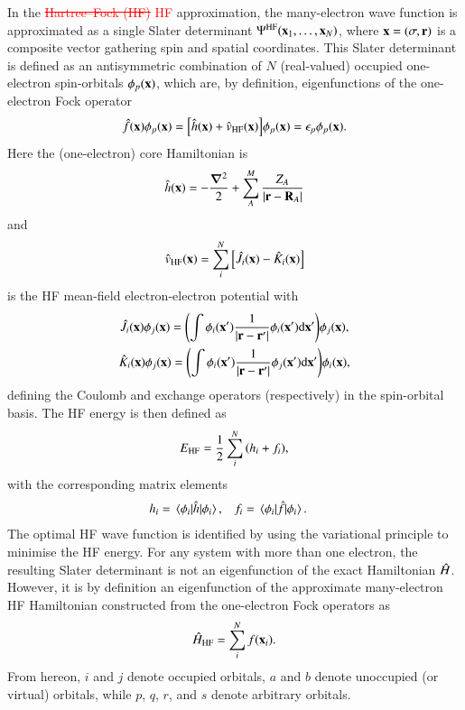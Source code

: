 \documentclass[aps,prb,reprint,noshowkeys,superscriptaddress]{revtex4-1}
\newcommand{\titou}[1]{\textcolor{red}{#1}}
\newcommand{\trash}[1]{\textcolor{red}{\sout{#1}}}
\newcommand{\Ne}{N} %
\newcommand{\Nn}{M} %
\newcommand{\hH}{\Hat{H}}
\begin{document}
In the \trash{Hartree--Fock (HF)} \titou{HF} approximation, the many-electron wave function is approximated as a single Slater determinant $\Psi^{\text{HF}}(\vb{x}_1,\ldots,\vb{x}_\Ne)$, where $\vb{x} = (\sigma,\vb{r})$ is a composite vector gathering spin and spatial coordinates.
This Slater determinant is defined as an antisymmetric combination of $\Ne$ (real-valued) occupied one-electron spin-orbitals $\phi_p(\vb{x})$, which are, by definition, eigenfunctions of the one-electron Fock operator 
\begin{equation}\label{eq:FockOp}
    \Hat{f}(\vb{x}) \phi_p(\vb{x}) = \qty[ \Hat{h}(\vb{x}) + \Hat{v}_\text{HF}(\vb{x}) ] \phi_p(\vb{x}) = \epsilon_p \phi_p(\vb{x}).
\end{equation}
Here the (one-electron) core Hamiltonian is
\begin{equation}
\label{eq:Hcore}
	\Hat{h}(\vb{x}) = -\frac{\grad^2}{2} + \sum_{A}^{\Nn} \frac{Z_A}{\abs{\vb{r}-\vb{R}_A}}
\end{equation}
and
\begin{equation}
    \Hat{v}_\text{HF}(\vb{x}) = \sum_i^{\Ne} \qty[ \Hat{J}_i(\vb{x}) - \Hat{K}_i(\vb{x}) ]
\end{equation}
is the HF mean-field electron-electron potential with 
\begin{subequations}
\begin{gather}
	\label{eq:CoulOp}
    \Hat{J}_i(\vb{x})\phi_j(\vb{x})=\qty(\int \phi_i(\vb{x}')\frac{1}{\abs{\vb{r} - \vb{r}'}}\phi_i(\vb{x}') \dd\vb{x}' ) \phi_j(\vb{x}),
	\\
	\label{eq:ExcOp}
\Hat{K}_i(\vb{x})\phi_j(\vb{x})=\qty(\int \phi_i(\vb{x}')\frac{1}{\abs{\vb{r} - \vb{r}'}}\phi_j(\vb{x}') \dd\vb{x}')\phi_i(\vb{x}),
\end{gather}
\end{subequations}
defining the Coulomb and exchange operators (respectively) in the spin-orbital basis.\cite{SzaboBook}
The HF energy is then defined as 
\begin{equation}
    \label{eq:E_HF}
    E_\text{HF} = \frac{1}{2} \sum_i^{\Ne} \qty( h_i + f_i ),
\end{equation}
with the corresponding matrix elements
\begin{align}
	h_i & = \mel{\phi_i}{\Hat{h}}{\phi_i},
    & 
    f_i & = \mel{\phi_i}{\Hat{f}}{\phi_i}.
\end{align}
The optimal HF wave function is identified by using the variational principle to minimise the HF energy.
For any system with more than one electron, the resulting Slater determinant is not an eigenfunction of the exact Hamiltonian $\hH$. 
However, it is by definition an eigenfunction of the approximate many-electron HF Hamiltonian constructed 
from the one-electron Fock operators as
\begin{equation}\label{eq:HFHamiltonian}
	\hH_{\text{HF}} = \sum_{i}^{\Ne} f(\vb{x}_i).
\end{equation}
From hereon, $i$ and $j$ denote occupied orbitals, $a$ and $b$ denote unoccupied (or virtual) orbitals, while $p$, $q$, $r$, and $s$ denote arbitrary orbitals.
\end{document}
